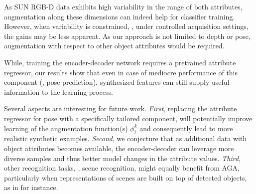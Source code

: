 \documentclass[10pt,twocolumn,letterpaper]{article}
\begin{document}
As SUN RGB-D data exhibits high variability in the range 
of both attributes, augmentation along these dimensions can 
indeed help for classifier training. However, when variability
is constrained, \eg, under controlled acquisition 
settings, the gains may be less apparent. As our approach 
is not limited to depth or pose, augmentation with respect
to other object attributes would be required.

While, training the encoder-decoder network requires 
a pretrained attribute regressor, our results show 
that even in case of mediocre performance of this component 
(\eg, pose prediction), synthesized features can still 
supply useful information to the learning process. 

Several aspects are interesting for future work. \emph{First},
replacing the attribute regressor for pose with a specifically
tailored component, will potentially improve learning of the
augmentation function(s) $\phi_i^k$ and consequently lead to
more realistic synthetic examples. \emph{Second}, we conjecture
that as additional data with object attributes becomes available, 
the encoder-decoder can leverage more diverse samples and 
thus better model changes in the attribute values. 
\emph{Third}, other recognition tasks, \eg, scene recognition,
might equally benefit from AGA, particularly when representations
of scenes are built on top of detected objects, as in \cite{Dixit16a}
for instance.





{\small


}
\end{document}
